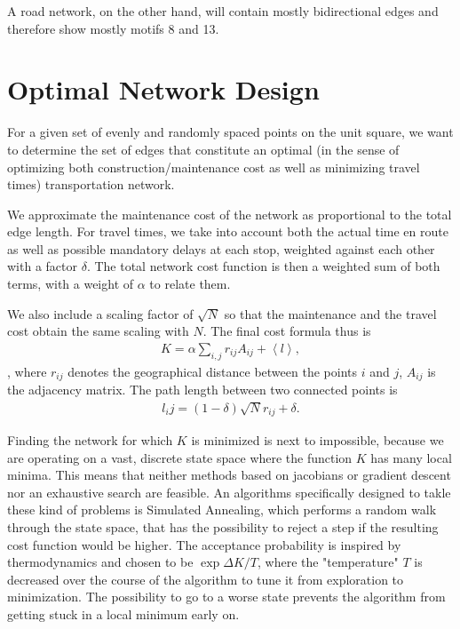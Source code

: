 \documentclass{scrartcl}
\begin{document}
A road network, on the other hand, will contain mostly bidirectional edges and therefore show mostly motifs 8 and 13. 

\section{Optimal Network Design}
For a given set of evenly and randomly spaced points on the unit square, we
want to determine the set of edges that constitute an optimal (in the sense
of optimizing both construction/maintenance cost as well as minimizing
travel times) transportation network.

We approximate the maintenance cost of the network as proportional to the
total edge length. For travel times, we take into account both the actual
time en route as well as possible mandatory delays at each stop, weighted
against each other with a factor $\delta$. The total network cost function
is then a weighted sum of both terms, with a weight of $\alpha$ to relate
them.  

We also include a scaling factor of $\sqrt{N}$ so that the maintenance and
the travel cost obtain the same scaling with $N$. The final cost formula
thus is
\begin{align}
 K = \alpha \sum_{i,j} r_{ij} A_{ij} + \left< l \right>,
\end{align}, where $r_{ij}$ denotes the geographical distance between the points $i$ and $j$, $A_{ij}$ is the adjacency matrix.
The path length between two connected points is 
\begin{align}
 l_ij = (1-\delta) \sqrt{N} r_{ij} + \delta.
\end{align}
 
Finding the network for which $K$ is minimized is next to impossible,
because we are operating on a vast, discrete state space where the function
$K$ has many local minima. This means that neither methods based on
jacobians or gradient descent nor an exhaustive search are feasible. 
An algorithms specifically designed to takle these kind of problems is
Simulated Annealing, which performs a random walk through the state space,
that has the possibility to reject a step if the resulting cost function
would be higher. The acceptance probability is inspired by thermodynamics
and chosen to be $\exp \Delta K/T$, where the "temperature" $T$ is
decreased over the course of the algorithm to tune it from exploration to
minimization. The possibility to go to a worse state prevents the algorithm
from getting stuck in a local minimum early on.
\end{document}
